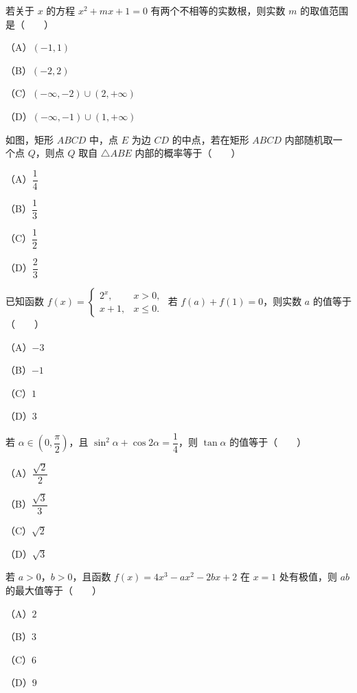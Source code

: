 \begin{question}
若关于 $x$ 的方程 $x^2+mx+1=0$ 有两个不相等的实数根，则实数 $m$ 的取值范围是\mbox{（　　）}

（A）$(-1,1)$

（B）$(-2,2)$

（C）$(-\infty,-2)\cup(2,+\infty)$

（D）$(-\infty,-1)\cup(1,+\infty)$

\Needspace{0.4\textheight}
\end{question}
\begin{question}
如图，矩形 $ABCD$ 中，点 $E$ 为边 $CD$ 的中点，若在矩形 $ABCD$ 内部随机取一个点 $Q$，则点 $Q$ 取自 $\triangle ABE$ 内部的概率等于\mbox{（　　）}

（A）$\dfrac14$

（B）$\dfrac13$

（C）$\dfrac12$

（D）$\dfrac23$
\nopagebreak[4]
\begin{center}\end{center}
\nopagebreak[4]
\end{question}
\begin{question}
已知函数 $f(x)=\begin{cases}2^x,&x>0,\\x+1,&x\leqslant0.\end{cases}$ 若 $f(a)+f(1)=0$，则实数 $a$ 的值等于\mbox{（　　）}

（A）$-3$

（B）$-1$

（C）$1$

（D）$3$

\end{question}
\begin{question}
若 $\alpha\in\left(0,\dfrac\pi2\right)$，且 $\sin^2\alpha+\cos2\alpha=\dfrac14$，则 $\tan\alpha$ 的值等于\mbox{（　　）}

（A）$\dfrac{\sqrt2}2$

（B）$\dfrac{\sqrt3}3$

（C）$\sqrt2$

（D）$\sqrt3$

\end{question}
\begin{question}
若 $a>0$，$b>0$，且函数 $f(x)=4x^3-ax^2-2bx+2$ 在 $x=1$ 处有极值，则 $ab$ 的最大值等于\mbox{（　　）}

（A）$2$

（B）$3$

（C）$6$

（D）$9$

\end{question}
